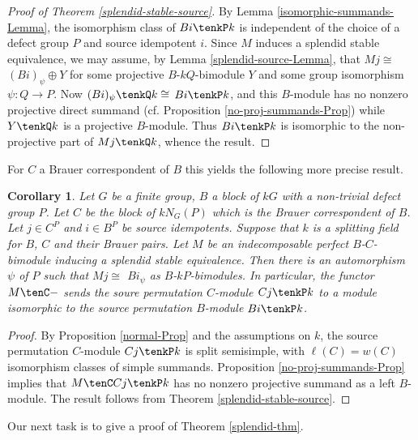 \documentclass{amsart}
\theoremstyle{plain}\newtheorem{Theorem}{Theorem}[section]
\theoremstyle{plain}\newtheorem{Conjecture}[Theorem]{Conjecture}
\theoremstyle{plain}\newtheorem{Corollary}[Theorem]{Corollary}
\theoremstyle{plain}\newtheorem{Lemma}[Theorem]{Lemma}
\theoremstyle{plain}\newtheorem{Proposition}[Theorem]{Proposition}
\theoremstyle{definition}\newtheorem{Definition}[Theorem]{Definition}
\theoremstyle{definition}\newtheorem{Example}[Theorem]{Example}
\theoremstyle{definition}\newtheorem{Examples}[Theorem]{Examples}
\theoremstyle{definition}\newtheorem{Exercise}[Theorem]{Exercise}
\theoremstyle{definition}\newtheorem{Notation}[Theorem]{Notation}
\theoremstyle{definition}\newtheorem{Remark}[Theorem]{Remark}
\theoremstyle{definition}\newtheorem{Remarks}[Theorem]{Remarks}
\theoremstyle{plain}\newtheorem{Statement}[Theorem]{}
\begin{document}
\begin{proof}[{Proof of Theorem \ref{splendid-stable-source}}]
By  Lemma \ref {isomorphic-summands-Lemma},
 the isomorphism class of $Bi\tenkP k$ is independent
of the choice of a defect group $P$ and source idempotent $i$.
Since $M$ induces a splendid stable equivalence, we may assume, by 
Lemma \ref{splendid-source-Lemma}, that $Mj\cong$ $(Bi)_\psi \oplus Y$ 
for some projective $B$-$kQ$-bimodule $Y$ and some
group isomorphism $\psi : Q\to P$. Now $(Bi)_\psi \tenkQ k\cong$
$Bi\tenkP k$, and this $B$-module has no nonzero projective direct
summand (cf. Proposition \ref{no-proj-summands-Prop}) 
while $Y\tenkQ k$ is a projective $B$-module.
Thus $Bi\tenkP k$ is isomorphic to the non-projective part of $Mj\tenkQ k$,
whence the result. 
\end{proof}

For $C$ a Brauer correspondent of $B$ this yields the following more  
precise  result.

\begin{Corollary}\label{splendid-source-Cor}
Let $G$ be a finite group, $B$  a block of $kG$ with a non-trivial defect group 
$P$. Let $C$ be the block of $kN_G(P)$ which is the Brauer correspondent of 
$B$. Let $j\in C^P$ and $i\in B^P$ be source idempotents. Suppose that $k$ is
a splitting field  for $B$, $C$ and their Brauer pairs.
Let $M$ be an indecomposable perfect $B$-$C$-bimodule inducing a splendid 
stable equivalence. Then there is an automorphism $\psi$ of $P$ such that
$Mj\cong$ $Bi_\psi$ as $B$-$kP$-bimodules. In particular, the functor
$M\tenC-$ sends the soure permutation $C$-module $Cj\tenkP k$ to a
module isomorphic to the source permutation $B$-module $Bi\tenkP k$.
\end{Corollary}

\begin{proof}
By Proposition \ref{normal-Prop} and the assumptions on $k$,
the source permutation $C$-module $Cj\tenkP k$ is split semisimple, 
with $\ell(C)=w(C)$ isomorphism classes of simple summands.
 Proposition \ref{no-proj-summands-Prop} implies that $M\tenC Cj\tenkP k$
 has no nonzero projective summand as a left $B$-module. 
 The result follows from Theorem \ref{splendid-stable-source}.
 \end{proof}




Our next task is to  give a proof of Theorem  \ref{splendid-thm}.
\end{document}
